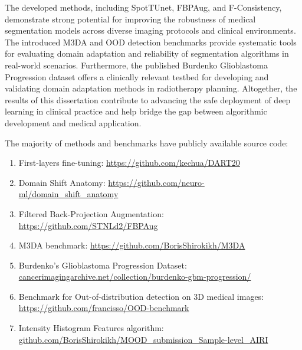 The developed methods, including SpotTUnet, FBPAug, and F-Consistency, demonstrate strong potential for improving the robustness of medical segmentation models across diverse imaging protocols and clinical environments. The introduced M3DA and OOD detection benchmarks provide systematic tools for evaluating domain adaptation and reliability of segmentation algorithms in real-world scenarios. Furthermore, the published Burdenko Glioblastoma Progression dataset offers a clinically relevant testbed for developing and validating domain adaptation methods in radiotherapy planning. Altogether, the results of this dissertation contribute to advancing the safe deployment of deep learning in clinical practice and help bridge the gap between algorithmic development and medical application.

The majority of methods and benchmarks have publicly available source code:

\begin{enumerate}
	\item First-layers fine-tuning: \href{https://github.com/kechua/DART20}{https://github.com/kechua/DART20}
	\item Domain Shift Anatomy: \hfill \hfill \linebreak \href{https://github.com/neuro-ml/domain_shift_anatomy}{https://github.com/neuro-ml/domain\_shift\_anatomy}
	\item Filtered Back-Projection Augmentation: \hfill \hfill \linebreak \href{https://github.com/STNLd2/FBPAug}{https://github.com/STNLd2/FBPAug}
	\item M3DA benchmark: \href{https://github.com/BorisShirokikh/M3DA}{https://github.com/BorisShirokikh/M3DA}
	\item {Burdenko's Glioblastoma Progression Dataset: \hfill \hfill \linebreak \href{https://www.cancerimagingarchive.net/collection/burdenko-gbm-progression/}{cancerimagingarchive.net/collection/burdenko-gbm-progression/}}
	\item Benchmark for Out-of-distribution detection on 3D medical images: \hfill \linebreak \href{https://github.com/francisso/OOD-benchmark}{https://github.com/francisso/OOD-benchmark}
	\item Intensity Histogram Features algorithm: \hfill \hfill \linebreak \href{https://github.com/BorisShirokikh/MOOD\_submission\_Sample-level\_AIRI}{github.com/BorisShirokikh/MOOD\_submission\_Sample-level\_AIRI}
\end{enumerate}

